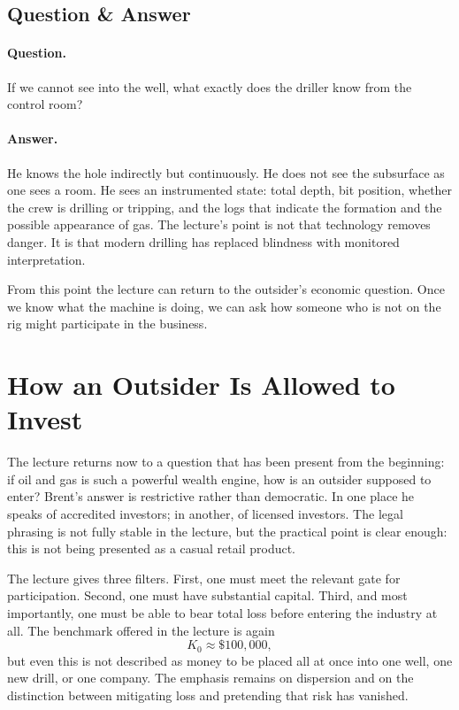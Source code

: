 \subsection{Question \& Answer}

\paragraph{Question.} If we cannot see into the well, what exactly does the driller know from the control room?

\paragraph{Answer.} He knows the hole indirectly but continuously. He does not see the subsurface as one sees a room. He sees an instrumented state: total depth, bit position, whether the crew is drilling or tripping, and the logs that indicate the formation and the possible appearance of gas. The lecture's point is not that technology removes danger. It is that modern drilling has replaced blindness with monitored interpretation.

From this point the lecture can return to the outsider's economic question. Once we know what the machine is doing, we can ask how someone who is not on the rig might participate in the business.

\section{How an Outsider Is Allowed to Invest}

The lecture returns now to a question that has been present from the beginning: if oil and gas is such a powerful wealth engine, how is an outsider supposed to enter? Brent's answer is restrictive rather than democratic. In one place he speaks of accredited investors; in another, of licensed investors. The legal phrasing is not fully stable in the lecture, but the practical point is clear enough: this is not being presented as a casual retail product.

The lecture gives three filters. First, one must meet the relevant gate for participation. Second, one must have substantial capital. Third, and most importantly, one must be able to bear total loss before entering the industry at all. The benchmark offered in the lecture is again
\begin{equation}
K_0 \approx \$100{,}000,
\end{equation}
but even this is not described as money to be placed all at once into one well, one new drill, or one company. The emphasis remains on dispersion and on the distinction between mitigating loss and pretending that risk has vanished.

